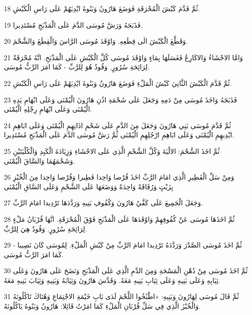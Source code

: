 \par 18 ثُمَّ قَدَّمَ كَبْشَ الْمُحْرَقَةِ فَوَضَعَ هَارُونُ وَبَنُوهُ ايْدِيَهُمْ عَلَى رَاسِ الْكَبْشِ.
\par 19 فَذَبَحَهُ وَرَشَّ مُوسَى الدَّمَ عَلَى الْمَذْبَحِ مُسْتَدِيرا.
\par 20 وَقَطَّعَ الْكَبْشَ الَى قِطَعِهِ. وَاوْقَدَ مُوسَى الرَّاسَ وَالْقِطَعَ وَالشَّحْمَ.
\par 21 وَامَّا الاحْشَاءُ وَالاكَارِعُ فَغَسَلَهَا بِمَاءٍ وَاوْقَدَ مُوسَى كُلَّ الْكَبْشِ عَلَى الْمَذْبَحِ. انَّهُ مُحْرَقَةٌ لِرَائِحَةِ سُرُورٍ. وَقُودٌ هُوَ لِلرَّبِّ - كَمَا امَرَ الرَّبُّ مُوسَى.
\par 22 ثُمَّ قَدَّمَ الْكَبْشَ الثَّانِيَ كَبْشَ الْمَلْءِ فَوَضَعَ هَارُونُ وَبَنُوهُ ايْدِيَهُمْ عَلَى رَاسِ الْكَبْشِ.
\par 23 فَذَبَحَهُ وَاخَذَ مُوسَى مِنْ دَمِهِ وَجَعَلَ عَلَى شَحْمَةِ اذُنِ هَارُونَ الْيُمْنَى وَعَلَى ابْهَامِ يَدِهِ الْيُمْنَى وَعَلَى ابْهَامِ رِجْلِهِ الْيُمْنَى.
\par 24 ثُمَّ قَدَّمَ مُوسَى بَنِي هَارُونَ وَجَعَلَ مِنَ الدَّمِ عَلَى شَحْمِ اذَانِهِمِ الْيُمْنَى وَعَلَى ابَاهِمِ ايْدِيهِمِ الْيُمْنَى وَعَلَى ابَاهِمِ ارْجُلِهِمِ الْيُمْنَى ثُمَّ رَشَّ مُوسَى الدَّمَ عَلَى الْمَذْبَحِ مُسْتَدِيرا.
\par 25 ثُمَّ اخَذَ الشَّحْمَ: الالْيَةَ وَكُلَّ الشَّحْمِ الَّذِي عَلَى الاحْشَاءِ وَزِيَادَةَ الْكَبِدِ وَالْكُلْيَتَيْنِ وَشَحْمَهُمَا وَالسَّاقَ الْيُمْنَى.
\par 26 وَمِنْ سَلِّ الْفَطِيرِ الَّذِي امَامَ الرَّبِّ اخَذَ قُرْصا وَاحِدا فَطِيرا وَقُرْصا وَاحِدا مِنَ الْخُبْزِ بِزَيْتٍ وَرُقَاقَةً وَاحِدَةً وَوَضَعَهَا عَلَى الشَّحْمِ وَعَلَى السَّاقِ الْيُمْنَى
\par 27 وَجَعَلَ الْجَمِيعَ عَلَى كَفَّيْ هَارُونَ وَكُفُوفِ بَنِيهِ وَرَدَّدَهَا تَرْدِيدا امَامَ الرَّبِّ.
\par 28 ثُمَّ اخَذَهَا مُوسَى عَنْ كُفُوفِهِمْ وَاوْقَدَهَا عَلَى الْمَذْبَحِ فَوْقَ الْمُحْرَقَةِ. انَّهَا قُرْبَانُ مَلْءٍ لِرَائِحَةِ سُرُورٍ. وَقُودٌ هِيَ لِلرَّبِّ.
\par 29 ثُمَّ اخَذَ مُوسَى الصَّدْرَ وَرَدَّدَهُ تَرْدِيدا امَامَ الرَّبِّ مِنْ كَبْشِ الْمَلْءِ. لِمُوسَى كَانَ نَصِيبا - كَمَا امَرَ الرَّبُّ مُوسَى.
\par 30 ثُمَّ اخَذَ مُوسَى مِنْ دُهْنِ الْمَسْحَةِ وَمِنَ الدَّمِ الَّذِي عَلَى الْمَذْبَحِ وَنَضَحَ عَلَى هَارُونَ وَعَلَى ثِيَابِهِ وَعَلَى بَنِيهِ وَعَلَى ثِيَابِ بَنِيهِ مَعَهُ. وَقَدَّسَ هَارُونَ وَثِيَابَهُ وَبَنِيهِ وَثِيَابَ بَنِيهِ مَعَهُ.
\par 31 ثُمَّ قَالَ مُوسَى لِهَارُونَ وَبَنِيهِ: «اطْبُخُوا اللَّحْمَ لَدَى بَابِ خَيْمَةِ الاجْتِمَاعِ وَهُنَاكَ تَاكُلُونَهُ وَالْخُبْزَ الَّذِي فِي سَلِّ قُرْبَانِ الْمَلْءِ كَمَا امَرْتُ قَائِلا: هَارُونُ وَبَنُوهُ يَاكُلُونَهُ.
